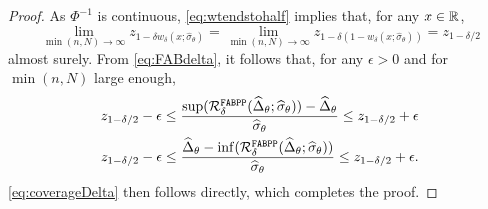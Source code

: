 \begin{proof}
    As $\Phi^{-1}$ is continuous, \cref{eq:wtendstohalf} implies that, for any $x\in\mathbb R$,
    $$
        \lim_{\min(n,N)\to\infty} z_{1-\delta w_\delta(x; \widehat{\sigma}_\theta)}=\lim_{\min(n,N)\to\infty} z_{1-\delta(1-w_\delta(x; \widehat{\sigma}_\theta))}=z_{1-\delta/2}
    $$
    almost surely. From \cref{eq:FABdelta}, it follows that, for any $\epsilon>0$ and for $\min(n,N)$ large enough,
    \begin{align*}
        z_{1 - \delta / 2}-\epsilon \leq \frac{\sup(\mathcal R^{\mathrm{\texttt{FABPP}}}_\delta(\widehat{\Delta}_\theta; \widehat{\sigma}_\theta )) - \widehat{\Delta}_\theta}{\widehat{\sigma}_\theta}\leq z_{1 - \delta / 2}+\epsilon\\
        z_{1 - \delta / 2}-\epsilon \leq \frac{\widehat{\Delta}_\theta - \inf(\mathcal R^{\mathrm{\texttt{FABPP}}}_\delta(\widehat{\Delta}_\theta; \widehat{\sigma}_\theta ))}{\widehat{\sigma}_\theta} \leq z_{1 - \delta / 2}+\epsilon.
    \end{align*}
    \eqref{eq:coverageDelta} then follows directly, which completes the proof.
\end{proof}

